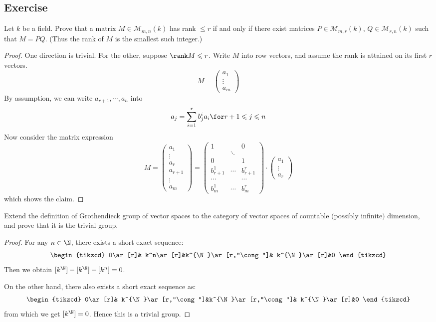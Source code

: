 \subsection{Exercise}
\begin{exercise}
Let $k$ be a field. Prove that a matrix $M\in\mathcal{M}_{m,n}(k)$ has rank $\leqslant r$ if and only if there exist matrices $P\in\mathcal{M}_{m,r}(k)$, $Q\in\mathcal{M}_{r,n}(k)$ such that $M=PQ$. (Thus the rank of $M$ is the smallest such integer.)
\end{exercise}
\begin{proof}
One direction is trivial. For the other, suppose $\rank M\leqslant r$. Write $M$ into row vectors, and assume the rank is attained on its first $r$ vectors.
\[M=\begin{pmatrix}
a_1\\
\vdots\\
a_m
\end{pmatrix}\]
By assumption, we can write $a_{r+1},\cdots,a_n$ into
\[a_{j}=\sum_{i=1}^{r}b^i_ja_i\for r+1\leqslant j\leqslant n\]
Now consider the matrix expression
\[M=\begin{pmatrix}
a_1\\
\vdots\\
a_r\\
a_{r+1}\\
\vdots\\
a_m
\end{pmatrix}=\begin{pmatrix}
1& &0\\
&\ddots& \\
0& &1\\
b^1_{r+1}&\cdots& b^r_{r+1}\\
\cdots&&\cdots\\
b^1_{m}&\cdots&b^r_m
\end{pmatrix}\cdot\begin{pmatrix}
a_1\\
\vdots\\
a_r
\end{pmatrix}\]
which shows the claim.
\end{proof}
\begin{exercise}
Extend the definition of Grothendieck group of vector spaces to the category of vector spaces of countable $($possibly infinite$)$ dimension, and prove that it is the trivial group.
\end{exercise}
\begin{proof}
For any $n\in\N$, there exists a short exact sequence:
\[\begin{tikzcd}
0\ar[r]& k^n\ar[r]&k^{\N}\ar[r,"\cong"]& k^{\N}\ar[r]&0
\end{tikzcd}\]
Then we obtain $[k^{\N}]-[k^{\N}]-[k^n]=0$. \par
On the other hand, there also exists a short exact sequence as:
\[\begin{tikzcd}
0\ar[r]& k^{\N}\ar[r,"\cong"]&k^{\N}\ar[r,"\cong"]& k^{\N}\ar[r]&0
\end{tikzcd}\]
from which we get $[k^{\N}]=0$. Hence this is a trivial group.
\end{proof}
